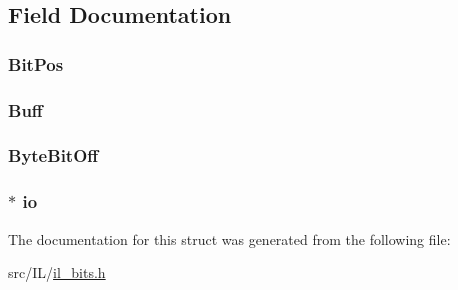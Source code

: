 \subsection{Field Documentation}
\hypertarget{struct_b_i_t_f_i_l_e_a380a5ab3a7e2398e9655769a7ec6a8b1}{
\subsubsection[{Bit\-Pos}]{ Bit\-Pos}}\label{struct_b_i_t_f_i_l_e_a380a5ab3a7e2398e9655769a7ec6a8b1}
\hypertarget{struct_b_i_t_f_i_l_e_a53cea2a5fc6fa367fe79be9c4564df3f}{
\subsubsection[{Buff}]{ Buff}}\label{struct_b_i_t_f_i_l_e_a53cea2a5fc6fa367fe79be9c4564df3f}
\hypertarget{struct_b_i_t_f_i_l_e_a1ac5917c39a2f4558be81522bc7c558a}{
\subsubsection[{Byte\-Bit\-Off}]{ Byte\-Bit\-Off}}\label{struct_b_i_t_f_i_l_e_a1ac5917c39a2f4558be81522bc7c558a}
\hypertarget{struct_b_i_t_f_i_l_e_ab6115e5993ca62edfb3a32ef981294c5}{
\subsubsection[{io}]{$\ast$ io}}\label{struct_b_i_t_f_i_l_e_ab6115e5993ca62edfb3a32ef981294c5}


The documentation for this struct was generated from the following file\-:\begin{DoxyCompactItemize}
\item 
src/\-I\-L/\hyperlink{il__bits_8h}{il\-\_\-bits.\-h}\end{DoxyCompactItemize}
